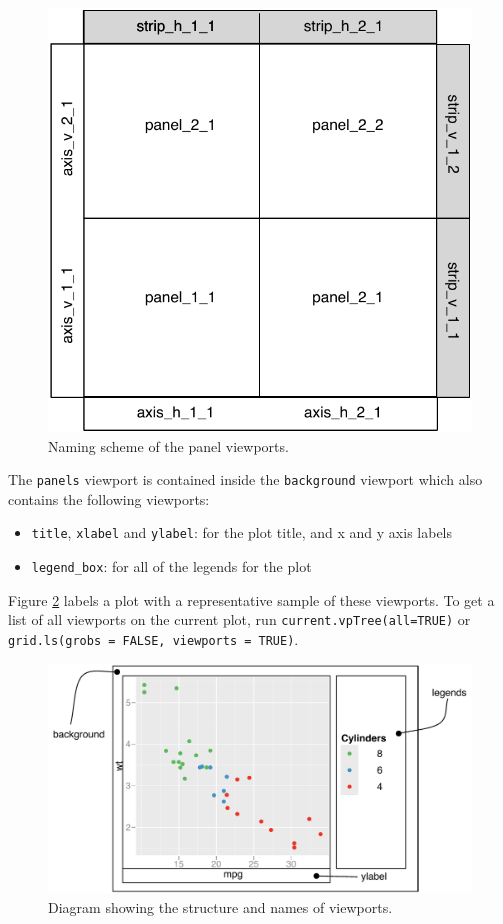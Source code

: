 \begin{figure}[htbp]
  \centering
    \includegraphics[width=0.5 \linewidth]{diagrams/grid-panelvp}
  \caption{Naming scheme of the panel viewports.}
  \label{fig:panelvp}
\end{figure}

The \texttt{panels} viewport is contained inside the \texttt{background}
viewport which also contains the following viewports:

\begin{itemize}
\itemsep1pt\parskip0pt
\item
  \texttt{title}, \texttt{xlabel} and \texttt{ylabel}: for the plot
  title, and x and y axis labels
\item
  \texttt{legend\_box}: for all of the legends for the plot
\end{itemize}

Figure \ref{fig:viewports} labels a plot with a representative sample of
these viewports. To get a list of all viewports on the current plot, run
\texttt{current.vpTree(all=TRUE)} or
\texttt{grid.ls(grobs = FALSE, viewports = TRUE)}.

\begin{figure}[htbp]
  \centering
    \includegraphics[width=\linewidth]{diagrams/grid-viewports}
  \caption{Diagram showing the structure and names of viewports.}
  \label{fig:viewports}
\end{figure}

